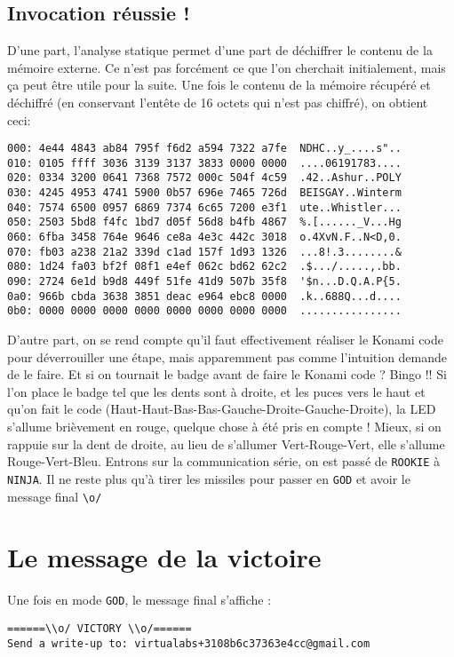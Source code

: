 \documentclass[11pt]{article}
\newcommand{\ttt}[1]{\texttt{#1}}
\begin{document}
    \subsection{Invocation réussie !}

    D'une part, l'analyse statique permet d'une part de déchiffrer le contenu de la mémoire externe. Ce n'est pas forcément ce que l'on cherchait initialement, mais ça peut être utile pour la suite. Une fois le contenu de la mémoire récupéré et déchiffré (en conservant l'entête de 16 octets qui n'est pas chiffré), on obtient ceci:

\begin{verbatim}
000: 4e44 4843 ab84 795f f6d2 a594 7322 a7fe  NDHC..y_....s"..
010: 0105 ffff 3036 3139 3137 3833 0000 0000  ....06191783....
020: 0334 3200 0641 7368 7572 000c 504f 4c59  .42..Ashur..POLY
030: 4245 4953 4741 5900 0b57 696e 7465 726d  BEISGAY..Winterm
040: 7574 6500 0957 6869 7374 6c65 7200 e3f1  ute..Whistler...
050: 2503 5bd8 f4fc 1bd7 d05f 56d8 b4fb 4867  %.[......_V...Hg
060: 6fba 3458 764e 9646 ce8a 4e3c 442c 3018  o.4XvN.F..N<D,0.
070: fb03 a238 21a2 339d c1ad 157f 1d93 1326  ...8!.3........&
080: 1d24 fa03 bf2f 08f1 e4ef 062c bd62 62c2  .$.../.....,.bb.
090: 2724 6e1d b9d8 449f 51fe 41d9 507b 35f8  '$n...D.Q.A.P{5.
0a0: 966b cbda 3638 3851 deac e964 ebc8 0000  .k..688Q...d....
0b0: 0000 0000 0000 0000 0000 0000 0000 0000  ................
\end{verbatim}

    D'autre part, on se rend compte qu'il faut effectivement réaliser le Konami code pour déverrouiller une étape, mais apparemment pas comme l'intuition demande de le faire. Et si on tournait le badge avant de faire le Konami code ? Bingo !! Si l'on place le badge tel que les dents sont à droite, et les puces vers le haut et qu'on fait le code (Haut-Haut-Bas-Bas-Gauche-Droite-Gauche-Droite), la LED s'allume brièvement en rouge, quelque chose à été pris en compte !
  Mieux, si on rappuie sur la dent de droite, au lieu de s'allumer Vert-Rouge-Vert, elle s'allume Rouge-Vert-Bleu. Entrons sur la communication série, on est passé de \ttt{ROOKIE} à \ttt{NINJA}. Il ne reste plus qu'à tirer les missiles pour passer en \ttt{GOD} et avoir le message final \verb|\o/|

  \section{Le message de la victoire}

  Une fois en mode \ttt{GOD}, le message final s'affiche :
\begin{verbatim}
======\\o/ VICTORY \\o/======
Send a write-up to: virtualabs+3108b6c37363e4cc@gmail.com
\end{verbatim}
\end{document}
